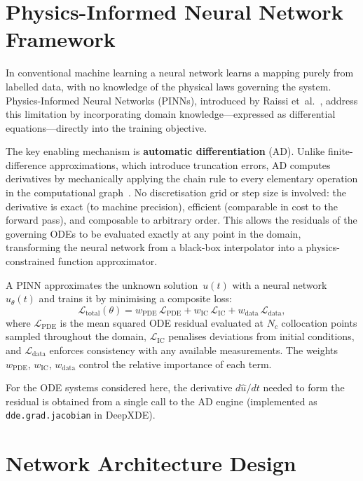 \documentclass[14pt,a4paper,openany]{extbook}
\begin{document}
\section{Physics-Informed Neural Network Framework}
\label{sec:pinn_framework}

In conventional machine learning a neural network learns a mapping purely
from labelled data, with no knowledge of the physical laws governing the
system.  Physics-Informed Neural Networks (PINNs), introduced by Raissi
et~al.~\cite{raissi2019}, address this limitation by incorporating domain
knowledge---expressed as differential equations---directly into the
training objective.

The key enabling mechanism is \textbf{automatic differentiation} (AD).
Unlike finite-difference approximations, which introduce truncation errors,
AD computes derivatives by mechanically applying the chain rule to every
elementary operation in the computational graph~\cite{baydin2018automatic}.
No discretisation grid or step size is involved: the derivative is exact
(to machine precision), efficient (comparable in cost to the forward pass),
and composable to arbitrary order.  This allows the residuals of the
governing ODEs to be evaluated exactly at any point in the domain,
transforming the neural network from a black-box interpolator into a
physics-constrained function approximator.

A PINN approximates the unknown solution~$u(t)$ with a neural network
$\hat{u}_\theta(t)$ and trains it by minimising a composite loss:
%
\begin{equation}
\label{eq:loss_composite}
\mathcal{L}_{\mathrm{total}}(\theta)
  = w_{\mathrm{PDE}}\,\mathcal{L}_{\mathrm{PDE}}
  + w_{\mathrm{IC}}\,\mathcal{L}_{\mathrm{IC}}
  + w_{\mathrm{data}}\,\mathcal{L}_{\mathrm{data}},
\end{equation}
%
where $\mathcal{L}_{\mathrm{PDE}}$ is the mean squared ODE residual
evaluated at $N_c$ collocation points sampled throughout the domain,
$\mathcal{L}_{\mathrm{IC}}$ penalises deviations from initial conditions,
and $\mathcal{L}_{\mathrm{data}}$ enforces consistency with any available
measurements.  The weights $w_{\mathrm{PDE}}$, $w_{\mathrm{IC}}$,
$w_{\mathrm{data}}$ control the relative importance of each term.

For the ODE systems considered here, the derivative $d\hat{u}/dt$ needed to
form the residual is obtained from a single call to the AD engine
(implemented as \texttt{dde.grad.jacobian} in DeepXDE).

\section{Network Architecture Design}
\label{sec:architecture}
\end{document}
